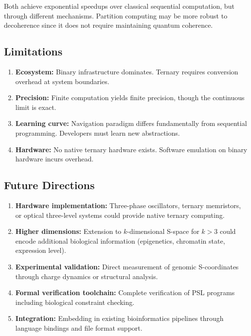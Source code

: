 \documentclass[twocolumn,10pt]{article}
\theoremstyle{remark}
\begin{document}
Both achieve exponential speedups over classical sequential computation, but through different mechanisms. Partition computing may be more robust to decoherence since it does not require maintaining quantum coherence.

\subsection{Limitations}

\begin{enumerate}
\item \textbf{Ecosystem:} Binary infrastructure dominates. Ternary requires conversion overhead at system boundaries.

\item \textbf{Precision:} Finite computation yields finite precision, though the continuous limit is exact.

\item \textbf{Learning curve:} Navigation paradigm differs fundamentally from sequential programming. Developers must learn new abstractions.

\item \textbf{Hardware:} No native ternary hardware exists. Software emulation on binary hardware incurs overhead.
\end{enumerate}

\subsection{Future Directions}

\begin{enumerate}
\item \textbf{Hardware implementation:} Three-phase oscillators, ternary memristors, or optical three-level systems could provide native ternary computing.

\item \textbf{Higher dimensions:} Extension to $k$-dimensional S-space for $k > 3$ could encode additional biological information (epigenetics, chromatin state, expression level).

\item \textbf{Experimental validation:} Direct measurement of genomic S-coordinates through charge dynamics or structural analysis.

\item \textbf{Formal verification toolchain:} Complete verification of PSL programs including biological constraint checking.

\item \textbf{Integration:} Embedding in existing bioinformatics pipelines through language bindings and file format support.
\end{enumerate}
\end{document}
